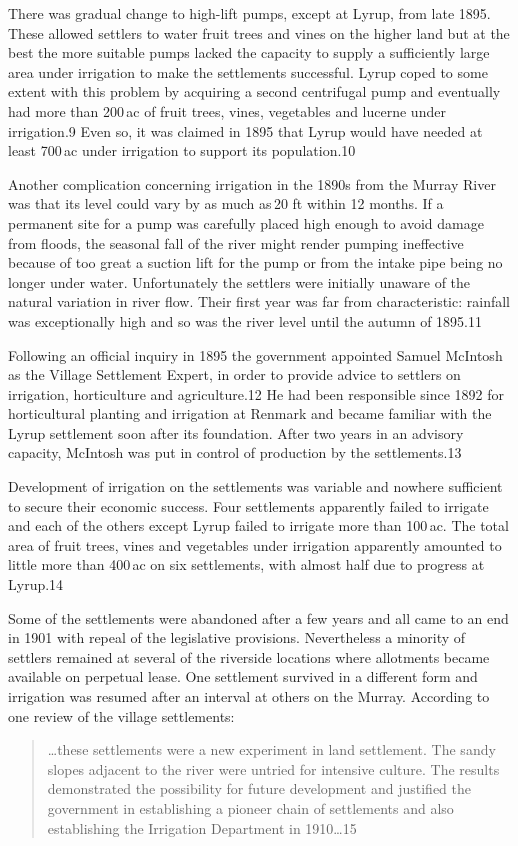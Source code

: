 There was gradual change to high-lift pumps, except at Lyrup, from
late 1895.  These allowed settlers to water fruit trees and vines on
the higher land but at the best the more suitable pumps lacked the
capacity to supply a sufficiently large area under irrigation to make
the settlements successful.  Lyrup coped to some extent with this
problem by acquiring a second centrifugal pump and eventually had more
than 200\,ac of fruit trees, vines, vegetables and lucerne under
irrigation.9 Even so, it was claimed in 1895 that Lyrup would have
needed at least 700\,ac under irrigation to support its population.10

Another complication concerning irrigation in the 1890s from the
Murray River was that its level could vary by as much as\,20 ft within
12 months.  If a permanent site for a pump was carefully placed high
enough to avoid damage from floods, the seasonal fall of the river
might render pumping ineffective because of too great a suction lift
for the pump or from the intake pipe being no longer under water.
Unfortunately the settlers were initially unaware of the natural
variation in river flow.  Their first year was far from
characteristic: rainfall was exceptionally high and so was the river
level until the autumn of 1895.11

Following an official inquiry in 1895 the government appointed Samuel
McIntosh as the Village Settlement Expert, in order to provide advice
to settlers on irrigation, horticulture and agriculture.12 He had been
responsible since 1892 for horticultural planting and irrigation at
Renmark and became familiar with the Lyrup settlement soon after its
foundation.  After two years in an advisory capacity, McIntosh was put
in control of production by the settlements.13

Development of irrigation on the settlements was variable and nowhere
sufficient to secure their economic success.  Four settlements
apparently failed to irrigate and each of the others except Lyrup
failed to irrigate more than 100\,ac. The total area of fruit trees,
vines and vegetables under irrigation apparently amounted to little
more than 400\,ac on six settlements, with almost half due to progress
at Lyrup.14

Some of the settlements were abandoned after a few years and all came
to an end in 1901 with repeal of the legislative provisions.
Nevertheless a minority of settlers remained at several of the
riverside locations where allotments became available on perpetual
lease.  One settlement survived in a different form and irrigation was
resumed after an interval at others on the Murray.  According to one
review of the village settlements:
\begin{quote}
	\ldots these settlements were a new experiment in land
	settlement.  The sandy slopes adjacent to the river were
	untried for intensive culture.  The results demonstrated the
	possibility for future development and justified the
	government in establishing a pioneer chain of settlements and
	also establishing the Irrigation Department in 1910\ldots15
\end{quote}

